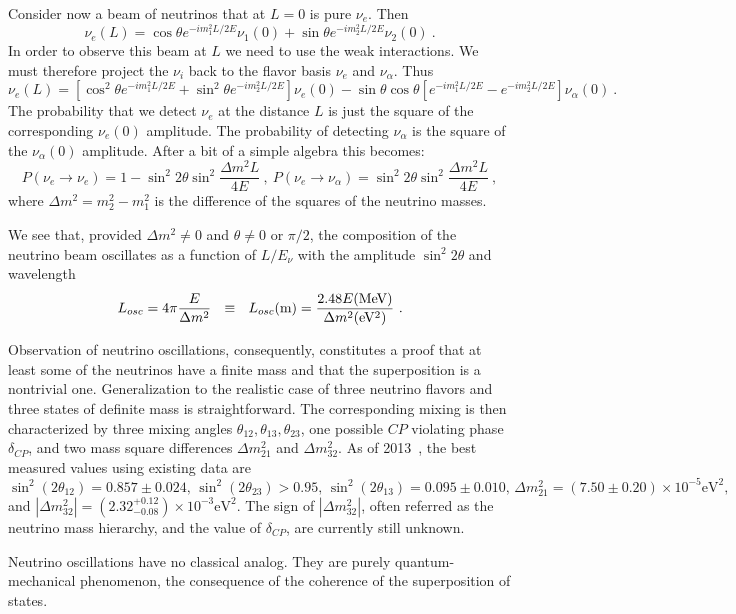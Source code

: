 \documentclass[aps,twocolumn,preprintnumbers,amsmath,superscriptaddress,amssymb,floats,nofootinbib]{revtex4-1}
\begin{document}
{{Consider now a beam of neutrinos that at $L=0$ is pure $\nu_e$. Then
\begin{equation}
\nu_e (L) = \cos \theta e^{-i m_1^2 L/2E} \nu_1(0) + \sin \theta e^{-i m_2^2 L/2E} \nu_2 (0) ~.
\end{equation}
In order to observe this beam at $L$ we need to use the weak interactions.  We must therefore project the $\nu_i$ back to the flavor basis $\nu_e$ and $\nu_{\alpha}$.
Thus
\begin{equation}
\nu_e (L) = [\cos^2 \theta e^{-i m_1^2 L/2E} + \sin^2 \theta e^{-i m_2^2 L/2E}] \nu_e(0) - 
\sin \theta \cos \theta [e^{-i m_1^2 L/2E} - e^{-i m_2^2 L/2E}] \nu_{\alpha}(0) ~.
\end{equation}
The probability that we detect $\nu_e$ at the distance $L$ is just the square of the corresponding $\nu_e(0)$ amplitude. The probability
of detecting $\nu_{\alpha}$ is the square of the $\nu_{\alpha}(0)$ amplitude. After a bit of a simple algebra this becomes:
\begin{equation}\label{eq:osci}
P(\nu_e \rightarrow \nu_e) = 1 - \sin^2 2 \theta \sin^2 \frac{\Delta m^2 L}{4 E} ~,~ P(\nu_e \rightarrow \nu_{\alpha}) =  \sin^2 2 \theta \sin^2 \frac{\Delta m^2 L}{4 E} ~,
\end{equation}
where $\Delta m^2 = m^2_2 - m^2_1$ is the difference of the squares of the neutrino masses. 

We see that, provided $\Delta m^2 \ne 0$ and $\theta \ne 0$ or $\pi/2$, the composition of the neutrino beam oscillates as a function of $L/E_{\nu}$ 
with the amplitude $\sin^2 2 \theta$ and wavelength
\begin{equation}
L_{osc} = 4 \pi \frac{E}{\Delta m^2} ~~\equiv ~~ L_{osc} ({\rm m}) = \frac{2.48 E {\rm (MeV)}}{ \Delta m^2 {\rm (eV^2)}} ~. 
\end{equation}

Observation of neutrino oscillations, consequently, constitutes a proof that at least some of the neutrinos have a finite mass and that the superposition is
a nontrivial one. Generalization to the realistic case of three neutrino flavors and three
states of definite mass is straightforward. The corresponding mixing is then characterized by three mixing angles $\theta_{12}, \theta_{13}, \theta_{23}$,
 one possible $CP$ violating phase $\delta_{CP}$,
and two mass square differences $\Delta m^2_{21}$ and $\Delta m^2_{32}$.
As of 2013~\cite{PDG14}, the best measured values using existing data are $\sin^2(2\theta_{12}) = 0.857 \pm 0.024, \, \sin^2(2\theta_{23}) > 0.95, \, \sin^2(2\theta_{13}) = 0.095 \pm 0.010, \, \Delta m^2_{21} = (7.50 \pm 0.20) \times 10^{-5} \textrm{eV}^2,  \, $ and $|\Delta m^2_{32}| = (2.32^{+0.12}_{-0.08}) \times 10^{-3} \textrm{eV}^2$. The sign of $|\Delta m^2_{32}|$, often referred as the neutrino mass hierarchy, and the value of $\delta_{CP}$, are currently still unknown.

Neutrino oscillations have no classical analog. They are purely quantum-mechanical phenomenon, the consequence of the coherence of the
superposition of states.

   }%
}
\end{document}
